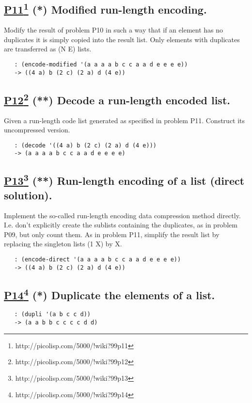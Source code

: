 \documentclass[10pt,a4paper]{article}
\begin{document}
\subsection*{\underline{P11}\footnote{http://picolisp.com/5000/!wiki?99p11} (*) Modified run-length encoding.}
Modify the result of problem P10 in such a way that if an element
has no duplicates it is simply copied into the result list. Only
elements with duplicates are transferred as (N E) lists.
\begin{verbatim}
   : (encode-modified '(a a a a b c c a a d e e e e))
   -> ((4 a) b (2 c) (2 a) d (4 e))
\end{verbatim}


\subsection*{\underline{P12}\footnote{http://picolisp.com/5000/!wiki?99p12} (**) Decode a run-length encoded list.}
Given a run-length code list generated as specified
in problem P11. Construct its uncompressed version.
\begin{verbatim}
   : (decode '((4 a) b (2 c) (2 a) d (4 e)))
   -> (a a a a b c c a a d e e e e)
\end{verbatim}


\subsection*{\underline{P13}\footnote{http://picolisp.com/5000/!wiki?99p13} (**) Run-length encoding of a list (direct solution).}
Implement the so-called run-length encoding data compression
method directly. I.e. don't explicitly create the sublists
containing the duplicates, as in problem P09, but only count them.
As in problem P11, simplify the result list by replacing the singleton
lists (1 X) by X.
\begin{verbatim}
   : (encode-direct '(a a a a b c c a a d e e e e))
   -> ((4 a) b (2 c) (2 a) d (4 e))
\end{verbatim}


\subsection*{\underline{P14}\footnote{http://picolisp.com/5000/!wiki?99p14} (*) Duplicate the elements of a list.}
\begin{verbatim}
   : (dupli '(a b c c d))
   -> (a a b b c c c c d d)
\end{verbatim}
\end{document}
